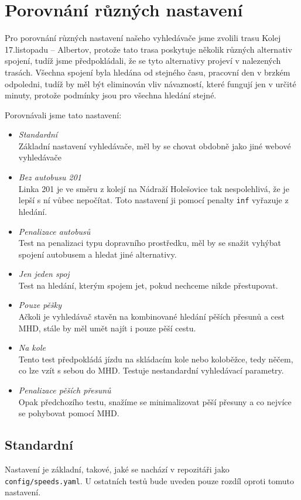 \section{Porovnání různých nastavení}
Pro porovnání různých nastavení našeho vyhledávače jsme zvolili trasu Kolej
17.listopadu -- Albertov, protože tato trasa poskytuje několik různých
alternativ spojení, tudíž jsme předpokládali, že se tyto alternativy projeví v
nalezených trasách. Všechna spojení byla hledána od stejného času, pracovní den
v brzkém odpoledni, tudíž by měl být eliminován vliv návazností, které fungují
jen v určité minuty, protože podmínky jsou pro všechna hledání stejné.

Porovnávali jsme tato nastavení:
\begin{itemize}
	\item {\em Standardní}\\Základní nastavení vyhledávače, měl by se chovat
	obdobně jako jiné webové vyhledávače
	\item {\em Bez autobusu 201}\\ Linka 201 je ve směru z kolejí na Nádraží
	Holešovice tak nespolehlivá, že je lepší s ní vůbec nepočítat. Toto
	nastavení ji pomocí penalty {\tt inf} vyřazuje z hledání.
	\item {\em Penalizace autobusů}\\ Test na penalizaci typu dopravního
	prostředku, měl by se snažit vyhýbat spojení autobusem a hledat jiné
	alternativy.
	\item {\em Jen jeden spoj}\\ Test na hledání, kterým spojem jet, pokud
	nechceme nikde přestupovat.
	\item {\em Pouze pěšky}\\ Ačkoli je vyhledávač stavěn na kombinované hledání
	pěších přesunů a cest MHD, stále by měl umět najít i pouze pěší cestu.
	\item {\em Na kole}\\ Tento test předpokládá jízdu na skládacím kole nebo
	koloběžce, tedy něčem, co lze vzít s sebou do MHD. Testuje nestandardní
	vyhledávací parametry.
	\item {\em Penalizace pěších přesunů}\\ Opak předchozího testu, snažíme se
	minimalizovat pěší přesuny a co nejvíce se pohybovat pomocí MHD.
\end{itemize}
\subsection{Standardní}
Nastavení je základní, takové, jaké se nachází v repozitáři jako {\tt
config/speeds.yaml}. U ostatních testů bude uveden pouze rozdíl oproti tomuto
nastavení.

